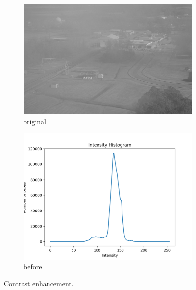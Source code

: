 \documentclass[11pt,a4paper]{article}
\begin{document}
\begin{figure}[h]
	\ContinuedFloat*
	\centering
	\begin{subfigure}[h]{0.7\textwidth}
		\includegraphics[width=\textwidth]{figs/lc2_gray}
		\caption{original}
		\label{fig:lc2_orig}
	\end{subfigure}
	
	\begin{subfigure}[h]{0.75\textwidth}
		\includegraphics[width=\textwidth]{figs/lc2_hist_bef}
		\caption{before}
		\label{fig:hist_bef_2}
	\end{subfigure}
	
	\caption{Contrast enhancement.}
	\label{fig:eq2}
\end{figure}

\clearpage
\end{document}
